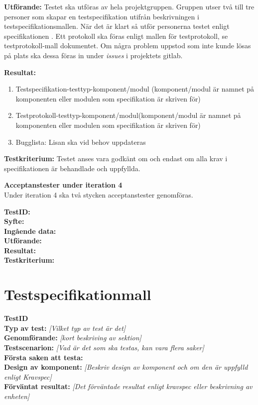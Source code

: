 \documentclass[a4paper,10pt]{article}
\begin{document}
\textbf{Utförande:} Testet ska utföras av hela projektgruppen. Gruppen utser två till tre personer som skapar en testspecifikation utifrån beskrivningen i
testspecifikationsmallen. När det är klart så utför personerna testet enligt specifikationen \cite{kravspec}. Ett protokoll ska föras enligt mallen för
testprotokoll, se testprotokoll-mall dokumentet. Om några problem uppstod som inte kunde lösas på plats ska dessa föras in under \emph{issues} i projektets
gitlab.

\textbf{Resultat:}
\begin{enumerate}
	\item \label{itm:Testspecifikation-a} Testspecifikation-testtyp-komponent/modul (komponent/modul är namnet på komponenten eller modulen som 					specifikation är skriven för)
    \item \label{itm:Testprotokoll-a} Testprotokoll-testtyp-komponent/modul(komponent/modul är namnet på komponenten eller modulen som
        specifikation är skriven för)
    \item Bugglista: Lisan ska vid behov uppdateras
\end{enumerate}

\textbf{Testkriterium:} Testet anses vara godkänt om och endast om alla krav i specifikationen är behandlade och uppfyllda.
\clearpage

\textbf{Acceptanstester under iteration 4}
\\ Under iteration 4 ska två stycken acceptanstester genomföras.

\textbf{TestID:} 
  \\ \textbf{Syfte:} 
  \\ \textbf{Ingående data:} 
  \\ \textbf{Utförande:} 
  \\ \textbf{Resultat:}	
  \\ \textbf{Testkriterium:}

\printbibliography

\newpage

\appendix
\section{Testspecifikationmall}
\label{sec: Testspecifikationmall}

   \textbf{TestID}
\\ \textbf{Typ av test:} \emph{[Vilket typ av test är det]}
\\ \textbf{Genomförande:} \emph{[kort beskriving av sektion]}
\\ \textbf{Testscenarion:} \emph{[Vad är det som ska testas, kan vara flera saker]}
\\ \textbf{Första saken att testa:}
\\ \textbf{Design av komponent:} \emph{[Beskriv design av komponent och om den är uppfylld enligt Kravspec]}
\\ \textbf{Förväntat resultat:} \emph{[Det förväntade resultat enligt kravspec eller beskrivning av enheten]}
\end{document}
